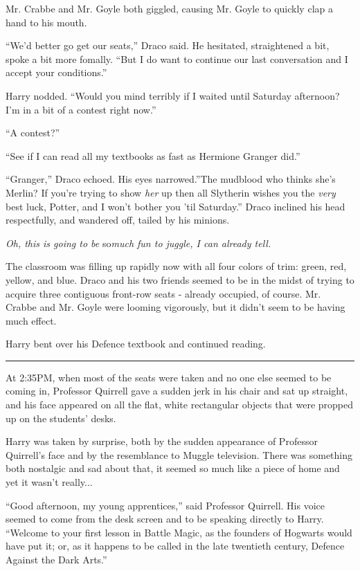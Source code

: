 Mr. Crabbe and Mr. Goyle both giggled, causing Mr. Goyle to quickly clap
a hand to his mouth.

``We'd better go get our seats,'' Draco said. He hesitated, straightened
a bit, spoke a bit more fomally. ``But I do want to continue our last
conversation and I accept your conditions.''

Harry nodded. ``Would you mind terribly if I waited until Saturday
afternoon? I'm in a bit of a contest right now.''

``A contest?''

``See if I can read all my textbooks as fast as Hermione Granger did.''

``Granger,'' Draco echoed. His eyes narrowed.''The mudblood who thinks
she's Merlin? If you're trying to show \emph{her} up then all Slytherin
wishes you the \emph{very} best luck, Potter, and I won't bother you
'til Saturday.'' Draco inclined his head respectfully, and wandered off,
tailed by his minions.

\emph{Oh, this is going to be} so\emph{much fun to juggle, I can already
tell.}

The classroom was filling up rapidly now with all four colors of trim:
green, red, yellow, and blue. Draco and his two friends seemed to be in
the midst of trying to acquire three contiguous front-row seats -
already occupied, of course. Mr. Crabbe and Mr. Goyle were looming
vigorously, but it didn't seem to be having much effect.

Harry bent over his Defence textbook and continued reading.

\begin{center}\rule{3in}{0.4pt}\end{center}

At 2:35PM, when most of the seats were taken and no one else seemed to
be coming in, Professor Quirrell gave a sudden jerk in his chair and sat
up straight, and his face appeared on all the flat, white rectangular
objects that were propped up on the students' desks.

Harry was taken by surprise, both by the sudden appearance of Professor
Quirrell's face and by the resemblance to Muggle television. There was
something both nostalgic and sad about that, it seemed so much like a
piece of home and yet it wasn't really...

``Good afternoon, my young apprentices,'' said Professor Quirrell. His
voice seemed to come from the desk screen and to be speaking directly to
Harry. ``Welcome to your first lesson in Battle Magic, as the founders
of Hogwarts would have put it; or, as it happens to be called in the
late twentieth century, Defence Against the Dark Arts.''

